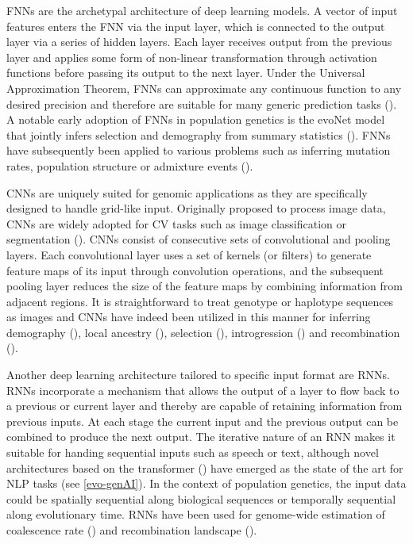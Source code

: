 \Acp{FNN} are the archetypal architecture of deep learning models. A vector of input features enters the \ac{FNN} via the input layer, which is connected to the output layer via a series of hidden layers. Each layer receives output from the previous layer and applies some form of non-linear transformation through activation functions before passing its output to the next layer. Under the Universal Approximation Theorem, \acp{FNN} can approximate any continuous function to any desired precision and therefore are suitable for many generic prediction tasks (\cite{korfmann_deep_2023}). A notable early adoption of \acp{FNN} in population genetics is the evoNet model that jointly infers selection and demography from summary statistics (\cite{sheehan_deep_2016}). \acp{FNN} have subsequently been applied to various problems such as inferring mutation rates, population structure or admixture events (\cite{huang_harnessing_2023}).

\Acfp{CNN} are uniquely suited for genomic applications as they are specifically designed to handle grid-like input. Originally proposed to process image data, \acp{CNN} are widely adopted for \ac{CV} tasks such as image classification or segmentation (\cite{lecun_deep_2015}). \acp{CNN} consist of consecutive sets of convolutional and pooling layers. Each convolutional layer uses a set of kernels (or filters) to generate feature maps of its input through convolution operations, and the subsequent pooling layer reduces the size of the feature maps by combining information from adjacent regions. It is straightforward to treat genotype or haplotype sequences as images and \acp{CNN} have indeed been utilized in this manner for inferring demography (\cite{flagel_unreasonable_2019,sanchez2021deep}), local ancestry (\cite{montserrat2020lai,sabat2022salai}), selection (\cite{flagel_unreasonable_2019,torada_imagene_2019}), introgression (\cite{blischak2021chromosome,gower2021detecting,ray2023introunet,zhang2023inferring}) and recombination (\cite{adrion_predicting_2020}).

Another deep learning architecture tailored to specific input format are \acfp{RNN}. \acp{RNN} incorporate a mechanism that allows the output of a layer to flow back to a previous or current layer and thereby are capable of retaining information from previous inputs. At each stage the current input and the previous output can be combined to produce the next output. The iterative nature of an \ac{RNN} makes it suitable for handing sequential inputs such as speech or text, although novel architectures based on the transformer (\cite{attention2017_3f5ee243}) have emerged as the state of the art for \ac{NLP} tasks (see \ref{evo-genAI}). In the context of population genetics, the input data could be spatially sequential along biological sequences or temporally sequential along evolutionary time. \acp{RNN} have been used for genome-wide estimation of coalescence rate (\cite{khomutov2021deep}) and recombination landscape (\cite{adrion_predicting_2020}).


